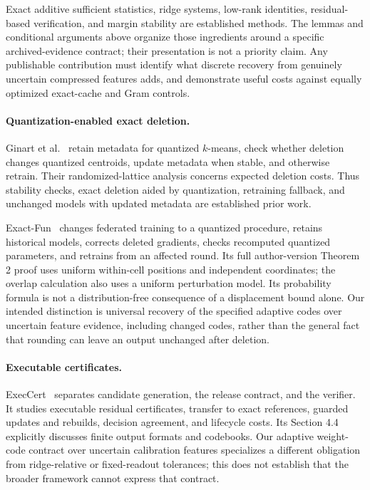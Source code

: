 \documentclass[10pt,twocolumn,letterpaper]{article}
\begin{document}
Exact additive sufficient statistics, ridge systems, low-rank identities,
residual-based verification, and margin stability are established methods. The
lemmas and conditional arguments above organize those ingredients around a
specific archived-evidence contract; their presentation is not a priority claim.
Any publishable contribution must identify what discrete recovery from genuinely
uncertain compressed features adds, and demonstrate useful costs against equally
optimized exact-cache and Gram controls.

\paragraph{Quantization-enabled exact deletion.}
Ginart et al.~\cite{ginart} retain metadata for quantized $k$-means, check whether
deletion changes quantized centroids, update metadata when stable, and otherwise
retrain. Their randomized-lattice analysis concerns expected deletion costs.
Thus stability checks, exact deletion aided by quantization, retraining fallback,
and unchanged models with updated metadata are established prior work.

Exact-Fun~\cite{exactfun} changes federated training to a quantized procedure,
retains historical models, corrects deleted gradients, checks recomputed
quantized parameters, and retrains from an affected round. Its full author-version
Theorem 2 proof uses uniform within-cell positions and independent coordinates;
the overlap calculation also uses a uniform perturbation model. Its probability
formula is not a distribution-free consequence of a displacement bound alone.
Our intended distinction is universal recovery of the specified adaptive codes
over uncertain feature evidence, including changed codes, rather than the
general fact that rounding can leave an output unchanged after deletion.

\paragraph{Executable certificates.}
ExecCert~\cite{execcert} separates candidate generation, the release contract, and
the verifier. It studies executable residual certificates, transfer to exact
references, guarded updates and rebuilds, decision agreement, and lifecycle costs.
Its Section 4.4 explicitly discusses finite output formats and codebooks. Our
adaptive weight-code contract over uncertain calibration features specializes a
different obligation from ridge-relative or fixed-readout tolerances; this does
not establish that the broader framework cannot express that contract.
\end{document}
